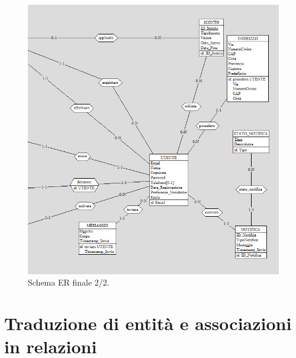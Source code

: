 \documentclass[a4paper,12pt]{report}
\begin{document}
	\begin{figure}[H]
		\centering
		\includegraphics[width=400pt]{ER/er_finale_dx.png}
		\caption{Schema ER finale 2/2.}
	\end{figure}
	
	\section{Traduzione di entità e associazioni in relazioni}
\end{document}
